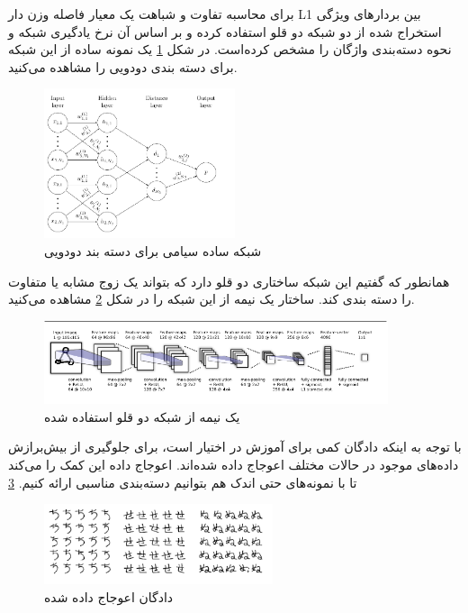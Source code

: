 برای محاسبه تفاوت و شباهت یک معیار فاصله وزن دار L1 بین بردار‌های ویژگی استخراج شده از دو شبکه دو قلو استفاده کرده و بر اساس آن نرخ یادگیری شبکه و نحوه دسته‌بندی واژگان را مشخص کرده‌است. در شکل
\ref{report:simple binarry siamese}
یک نمونه ساده از این شبکه برای دسته بندی دودویی را مشاهده می‌کنید.
 
\begin{figure}[h]
	\centering
	\includegraphics[width=0.5\textwidth]{img/report/simple_binary_classification_siamese}
	\caption{شبکه ساده سیامی برای دسته بند دودویی \cite{Koch}}
	\label{report:simple binarry siamese}
	\centering
\end{figure}

همانطور که گفتیم این شبکه ساختاری دو قلو دارد که بتواند یک زوج مشابه یا متفاوت را دسته بندی کند. ساختار یک نیمه از این شبکه را در شکل 
\ref{report:siamese half network}
مشاهده می‌کنید.
\begin{figure}[h]
	\centering
	\includegraphics[width=0.9\textwidth]{img/report/siamse_half_network}
	\caption{یک نیمه از شبکه دو قلو استفاده شده \cite{Koch}}
	\label{report:siamese half network}
	\centering
\end{figure}

با توجه به اینکه دادگان کمی برای آموزش در اختیار است، برای جلوگیری از بیش‌برازش داده‌های موجود در حالات مختلف اعوجاج داده شده‌اند. اعوجاج داده این کمک را می‌کند تا با نمونه‌های حتی اندک هم بتوانیم دسته‌بندی مناسبی ارائه کنیم.
\ref{report:augmented siamese data}

\begin{figure}[h]
	\centering
	\includegraphics[width=0.6\textwidth]{img/report/augmented_siamese_data}
	\caption{دادگان اعوجاج داده شده \cite{Koch}}
	\label{report:augmented siamese data}
	\centering
\end{figure}
